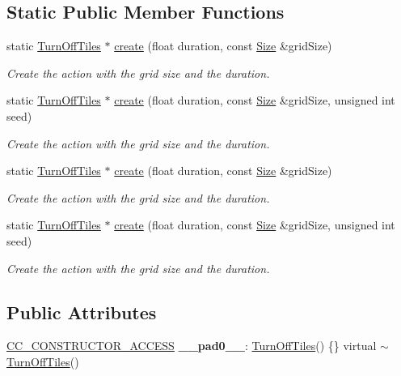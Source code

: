 \subsection*{Static Public Member Functions}
\begin{DoxyCompactItemize}
\item 
static \hyperlink{classTurnOffTiles}{Turn\+Off\+Tiles} $\ast$ \hyperlink{classTurnOffTiles_a8434139ca262b80d684868a154912801}{create} (float duration, const \hyperlink{classSize}{Size} \&grid\+Size)
\begin{DoxyCompactList}\small\item\em Create the action with the grid size and the duration. \end{DoxyCompactList}\item 
static \hyperlink{classTurnOffTiles}{Turn\+Off\+Tiles} $\ast$ \hyperlink{classTurnOffTiles_a7db2be7fd181ac9cac678fa2f3801471}{create} (float duration, const \hyperlink{classSize}{Size} \&grid\+Size, unsigned int seed)
\begin{DoxyCompactList}\small\item\em Create the action with the grid size and the duration. \end{DoxyCompactList}\item 
static \hyperlink{classTurnOffTiles}{Turn\+Off\+Tiles} $\ast$ \hyperlink{classTurnOffTiles_a401085568f4dc0441f5314442b2d19ec}{create} (float duration, const \hyperlink{classSize}{Size} \&grid\+Size)
\begin{DoxyCompactList}\small\item\em Create the action with the grid size and the duration. \end{DoxyCompactList}\item 
static \hyperlink{classTurnOffTiles}{Turn\+Off\+Tiles} $\ast$ \hyperlink{classTurnOffTiles_af2b5a667a9b12e6f7ee5ca38b6af709e}{create} (float duration, const \hyperlink{classSize}{Size} \&grid\+Size, unsigned int seed)
\begin{DoxyCompactList}\small\item\em Create the action with the grid size and the duration. \end{DoxyCompactList}\end{DoxyCompactItemize}
\subsection*{Public Attributes}
\begin{DoxyCompactItemize}
\item 
\mbox{\label{classTurnOffTiles_a055518e89ea9e7a4309ddd65bf5a4517}} 
\hyperlink{_2cocos2d_2cocos_2base_2ccConfig_8h_a25ef1314f97c35a2ed3d029b0ead6da0}{C\+C\+\_\+\+C\+O\+N\+S\+T\+R\+U\+C\+T\+O\+R\+\_\+\+A\+C\+C\+E\+SS} {\bfseries \+\_\+\+\_\+pad0\+\_\+\+\_\+}\+: \hyperlink{classTurnOffTiles}{Turn\+Off\+Tiles}() \{\} virtual $\sim$\hyperlink{classTurnOffTiles}{Turn\+Off\+Tiles}()
\end{DoxyCompactItemize}
